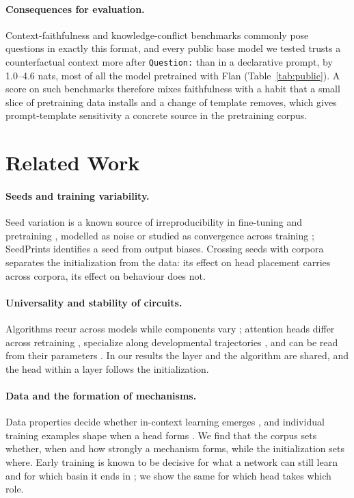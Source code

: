 \documentclass[11pt]{article}
\newcommand{\tmpl}[1]{\texttt{#1}}
\begin{document}
\paragraph{Consequences for evaluation.}
Context-faithfulness and knowledge-conflict benchmarks commonly pose questions in exactly this format, and every public base model we tested trusts a counterfactual context more after \tmpl{Question:} than in a declarative prompt, by 1.0--4.6 nats, most of all the model pretrained with Flan (Table~\ref{tab:public}).
A score on such benchmarks therefore mixes faithfulness with a habit that a small slice of pretraining data installs and a change of template removes, which gives prompt-template sensitivity \citep{sclar2024quantifying,hua2025flaw,liu2026prompt} a concrete source in the pretraining corpus.

\section{Related Work}
\label{sec:related}

\paragraph{Seeds and training variability.}
Seed variation is a known source of irreproducibility in fine-tuning and pretraining \citep{reimers2017reporting,dodge2020fine,mccoy2020berts,sellam2022multiberts}, modelled as noise \citep{benitosantos2025robust} or studied as convergence across training \citep{fehlauer2025convergence,vanderwal2025polypythias}; SeedPrints \citep{tong2026seedprints} identifies a seed from output biases.
Crossing seeds with corpora separates the initialization from the data: its effect on head placement carries across corpora, its effect on behaviour does not.

\paragraph{Universality and stability of circuits.}
Algorithms recur across models while components vary \citep{chughtai2023toy,gurnee2024universal,tigges2024llm}; attention heads differ across retraining \citep{bali2026quantifying}, specialize along developmental trajectories \citep{wang2025differentiation}, and can be read from their parameters \citep{elhelo2025maps}.
In our results the layer and the algorithm are shared, and the head within a layer follows the initialization.

\paragraph{Data and the formation of mechanisms.}
Data properties decide whether in-context learning emerges \citep{chan2022data,singh2024needs}, and individual training examples shape when a head forms \citep{chen2026mechanistic}.
We find that the corpus sets whether, when and how strongly a mechanism forms, while the initialization sets where.
Early training is known to be decisive for what a network can still learn \citep{achille2019critical} and for which basin it ends in \citep{frankle2020linear}; we show the same for which head takes which role.
\end{document}
